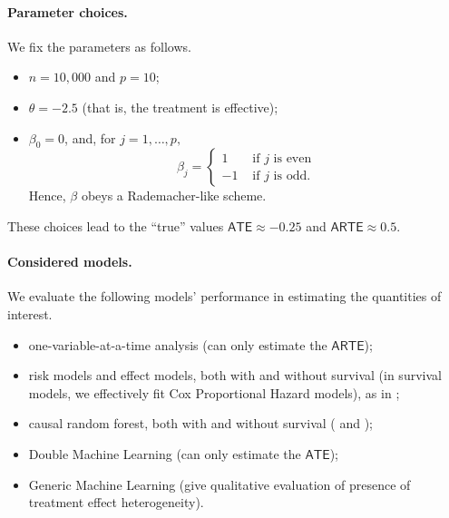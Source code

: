 \documentclass[11pt]{article}
\begin{document}
\paragraph{Parameter choices.} We fix the parameters as follows.
\begin{itemize}
    \item $n=10,000$ and $p=10$;
    \item $\theta = -2.5$ (that is, the treatment is effective);
    \item $\beta_0 = 0$, and, for $j=1,\dots,p,$
    \[
        \beta_j = \begin{cases}
        1 &\text{ if $j$ is even}\\
        -1  &\text{ if $j$ is odd}.
        \end{cases}
    \]
    Hence, $\beta$ obeys a Rademacher-like scheme.
\end{itemize}
These choices lead to the ``true'' values $\textsf{ATE}\approx -0.25$ and $\textsf{ARTE} \approx 0.5$.

\paragraph{Considered models.} We evaluate the following models'  performance in estimating the quantities of interest.
\begin{itemize}
    \item one-variable-at-a-time analysis (can only estimate the $\textsf{ARTE}$);
    \item risk models and effect models, both with and without survival (in survival models, we effectively fit Cox Proportional Hazard models), as in \cite{kent2020path};
    \item causal random forest, both with and without survival (\citealp{athey2019grf} and \citealp{cui2021estimating});
    \item Double Machine Learning \citep{chernozhukov2018double} (can only estimate the $\textsf{ATE}$);
    \item Generic Machine Learning \citep{chernozhukov2020generic} (give qualitative evaluation of presence of treatment effect heterogeneity).
\end{itemize}


\end{document}
